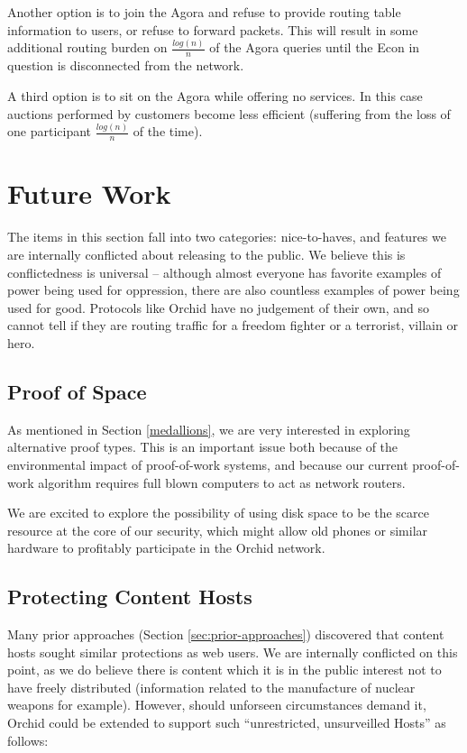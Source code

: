 \documentclass{article}
\newcommand{\orchid}{Orchid}
\newcommand{\Orchid}{\orchid}
\begin{document}
Another option is to join the Agora and refuse to provide routing
table information to users, or refuse to forward packets. This will
result in some additional routing burden on $\frac{log(n)}{n}$ of the
Agora queries until the Econ in question is disconnected from the
network.

A third option is to sit on the Agora while offering no services. In
this case auctions performed by customers become less efficient
(suffering from the loss of one participant $\frac{log(n)}{n}$ of the
time).

\section{Future Work}
\label{sec:future}

The items in this section fall into two categories: nice-to-haves, and features we are internally conflicted about releasing to the public. We believe this is conflictedness is universal -- although almost everyone has favorite examples of power being used for oppression, there are also countless examples of power being used for good. Protocols like \Orchid{} have no judgement of their own, and so cannot tell if they are routing traffic for a freedom fighter or a terrorist, villain or hero.

\subsection{Proof of Space}
\label{future:proof-of-space}

As mentioned in Section \ref{medallions}, we are very interested in
exploring alternative proof types. This is an important issue both
because of the environmental impact of proof-of-work systems, and
because our current proof-of-work algorithm requires full blown
computers to act as network routers.

We are excited to explore the possibility of using disk space to be
the scarce resource at the core of our security, which might allow old
phones or similar hardware to profitably participate in the \Orchid{}
network.

\subsection{Protecting Content Hosts}
\label{subsec:protocol-extentions}

Many prior approaches (Section \ref{sec:prior-approaches}) discovered that content hosts sought similar protections as web users. We are internally conflicted on this point, as we do believe there is content which it is in the public interest not to have freely distributed (information related to the manufacture of nuclear weapons for example). However, should unforseen circumstances demand it, \Orchid{} could be extended to support such ``unrestricted, unsurveilled Hosts'' as follows:
\end{document}
